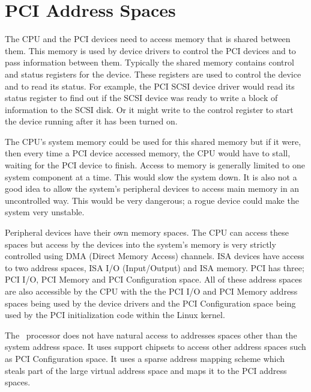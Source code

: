 \section{PCI Address Spaces}
The CPU and the PCI devices need to access memory that is shared
between them.
This memory is used by device drivers to control the PCI devices and
to pass information between them.
Typically the shared memory contains control and status registers for the
device.
These registers are used to control the device and to read its status.
For example, the PCI SCSI device driver would read its status register
to find out if the SCSI device was ready to write a block of information
to the SCSI disk.
Or it might write to the control register to start the device running after it
has been turned on.

The CPU's system memory could be used  for this shared memory but if it were, then every time a 
PCI device accessed memory, the CPU would have to stall, waiting for
the PCI device to finish.
Access to memory is generally limited to one system component at a time.
This would slow the system down.
It is also not a good idea to allow the system's peripheral devices to
access main memory in an uncontrolled way.
This would be very dangerous; a rogue device could make the system
very unstable.

Peripheral devices have their own memory spaces.
The CPU can access these spaces but access by the devices into the
system's memory is very strictly controlled using DMA (Direct Memory
Access) channels.
ISA devices have access to two address spaces, ISA I/O (Input/Output) 
and ISA memory.
PCI has three; PCI I/O, PCI Memory and PCI Configuration space.
All of these address spaces are also accessible by the CPU with the
the PCI I/O and PCI Memory address spaces being used by the device
drivers and the PCI Configuration space being used by the PCI initialization
code within the Linux kernel.

The \axp\ processor does not have natural access to addresses spaces other than
the system address space.
It uses support chipsets to access other address spaces such as PCI Configuration
space.
It uses a sparse address mapping scheme which steals part of the large virtual 
address space and maps it to the PCI address spaces.

